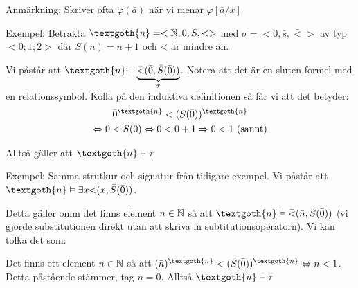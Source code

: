 \par\bigskip
\noindent Anmärkning: Skriver ofta $\varphi(\bar{a})$ när vi menar $\varphi[\bar{a}/x]$
\par\bigskip
\noindent Exempel: Betrakta $\textgoth{n} = <\N,0,S,<>$ med $\sigma = <\bar{0}, \bar{s}, \bar{<}>$ av typ $<0;1;2>$ där $S(n) = n+1$ och < är mindre än.\par
\noindent Vi påstår att $\textgoth{n}\vDash\underbrace{\bar{<}(\bar{0},\bar{S}(\bar{0}))}_{\text{$\tau$}}$. Notera att det är en sluten formel med en relationssymbol. Kolla på den induktiva definitionen så får vi att det betyder:
\begin{equation*}
  \begin{gathered}
    \bar{0}^{\textgoth{n}}<(\bar{S}(\bar{0}))^{\textgoth{n}}\\
    \Lrarr 0 < S(0)\Lrarr 0<0+1 \Rightarrow 0<1 \text{ (sannt)}
  \end{gathered}
\end{equation*}\par
\noindent Alltså gäller att $\textgoth{n}\vDash\tau$
\par\bigskip
\noindent Exempel: Samma strutkur och signatur från tidigare exempel. Vi påstår att $\textgoth{n}\vDash\exists x\bar{<}(x,\bar{S}(\bar{0}))$.\par
\noindent Detta gäller omm det finns element $n\in\mathbb{N}$ så att $\textgoth{n}\vDash\bar{<}(\bar{n},\bar{S}(\bar{0}))$ (vi gjorde substitutionen direkt utan att skriva in subtitutionsoperatorn). Vi kan tolka det som:\par
\noindent Det finns ett element $n\in\mathbb{N}$ så att $(\bar{n})^{\textgoth{n}}<(\bar{S}(\bar{0}))^{\textgoth{n}}\Lrarr n< 1$. Detta påstående stämmer, tag $n=0$. Alltså $\textgoth{n}\vDash\tau$ 
